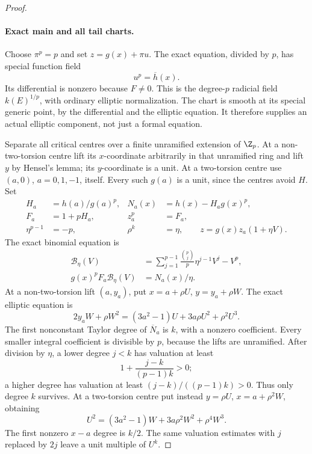\begin{proof}
\paragraph{Exact main and all tail charts.}
Choose \(\pi^p=p\) and set \(z=g(x)+\pi u\).
The exact equation, divided by \(p\), has special
function field
\[
                         u^p=\overline h(x).
                                                        \tag{A.62.11}
\]
Its differential is nonzero because \(F\ne0\).
This is the degree-\(p\) radicial field
\(k(E)^{1/p}\), with ordinary elliptic normalization.
The chart is smooth at its special generic point,
by the differential and the elliptic equation.
It therefore supplies an actual elliptic component,
not just a formal equation.

Separate all critical centres over a finite
unramified extension of \(\Z_p\). At a non-two-torsion
centre lift its \(x\)-coordinate arbitrarily in that
unramified ring and lift \(y\) by Hensel's lemma;
its \(y\)-coordinate is a unit. At a two-torsion
centre use \((a,0)\), \(a=0,1,-1\), itself.
Every such \(g(a)\) is a unit, since the centres
avoid \(H\). Set
\[
 \begin{aligned}
 H_a&=h(a)/g(a)^p,&
 N_a(x)&=h(x)-H_a g(x)^p,\\
 F_a&=1+pH_a,& z_a^p&=F_a,\\
 \eta^{p-1}&=-p,& \rho^k&=\eta,
                \qquad z=g(x)z_a(1+\eta V).
 \end{aligned}                                         \tag{A.62.12}
\]
The exact binomial equation is
\[
 \begin{aligned}
 \mathcal B_\eta(V)
   &=\sum_{j=1}^{p-1}\frac{\binom pj}{p}\eta^{j-1}V^j-V^p,\\
 g(x)^pF_a\mathcal B_\eta(V)&=N_a(x)/\eta.
 \end{aligned}                                         \tag{A.62.13}
\]
At a non-two-torsion lift \((a,y_a)\), put
\(x=a+\rho U\), \(y=y_a+\rho W\). The exact
elliptic equation is
\[
 2y_aW+\rho W^2
          =(3a^2-1)U+3a\rho U^2+\rho^2U^3.
                                                        \tag{A.62.14}
\]
The first nonconstant Taylor degree of
\(\overline N_a\) is \(k\), with a nonzero
coefficient. Every smaller integral coefficient
is divisible by \(p\), because the lifts are
unramified. After division by \(\eta\), a lower
degree \(j<k\) has valuation at least
\[
                 1+\frac{j-k}{(p-1)k}>0;
                                                        \tag{A.62.15}
\]
a higher degree has valuation at least
\((j-k)/((p-1)k)>0\). Thus only degree \(k\)
survives. At a two-torsion centre put instead
\(y=\rho U\), \(x=a+\rho^2W\), obtaining
\[
 U^2=(3a^2-1)W+3a\rho^2W^2+\rho^4W^3.
                                                        \tag{A.62.16}
\]
The first nonzero \(x-a\) degree is \(k/2\).
The same valuation estimates with \(j\) replaced
by \(2j\) leave a unit multiple of \(U^k\).


\end{proof}
